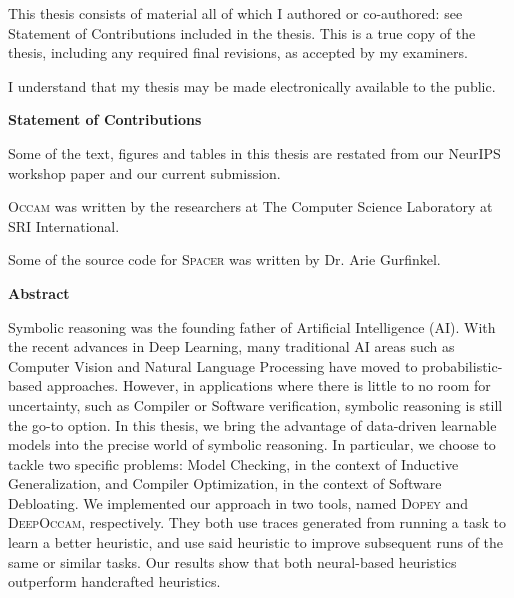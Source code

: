 

  \noindent
This  thesis  consists  of  material  all  of  which  I  authored  or  co-authored: see  Statement of Contributions included in the thesis.  This is a true copy of the thesis,  including any required final revisions, as accepted by my examiners. 



  \bigskip
  
  \noindent
I understand that my thesis may be made electronically available to the public.

\cleardoublepage
\begin{center}
\textbf{Statement of Contributions}
\end{center}
Some of the text, figures and tables in this thesis are restated from our NeurIPS workshop paper \cite{Nham:nips19} and our current submission.

\textsc{Occam} was written by the researchers at The Computer Science Laboratory at SRI International.

Some of the source code for \textsc{Spacer} was written by Dr. Arie Gurfinkel.
\cleardoublepage

\begin{center}\textbf{Abstract}\end{center}
Symbolic reasoning was the founding father of Artificial Intelligence (AI). With the recent advances in Deep Learning, many traditional AI areas such as Computer Vision and Natural Language Processing have moved to probabilistic-based approaches. However, in applications where there is little to no room for uncertainty, such as Compiler or Software verification, symbolic reasoning is still the go-to option. In this thesis, we bring the advantage of data-driven learnable models into the precise world of symbolic reasoning. In particular, we choose to tackle two specific problems: Model Checking, in the context of Inductive Generalization, and Compiler Optimization, in the context of Software Debloating. We implemented our approach in two tools, named \textsc{Dopey} and \textsc{DeepOccam}, respectively. They both use traces generated from running a task to learn a better heuristic, and use said heuristic to improve subsequent runs of the same or similar tasks. Our results show that both neural-based heuristics outperform handcrafted heuristics.

